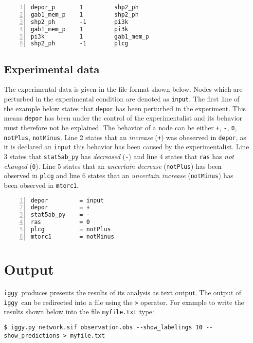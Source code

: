 \documentclass{article}
\newcommand\iggy{\texttt{iggy}}
\begin{document}
\begin{Verbatim}[frame=single,numbers=left]
depor_p       1         shp2_ph
gab1_mem_p    1         shp2_ph
shp2_ph       -1        pi3k
gab1_mem_p    1         pi3k
pi3k          1         gab1_mem_p
shp2_ph       -1        plcg
\end{Verbatim} 


\subsection{Experimental data}

The experimental data is given in the file format shown below.
Nodes which are perturbed in the experimental condition are denoted as \texttt{input}.
The first line of the example below states that \texttt{depor} has been perturbed in the experiment.
This means \texttt{depor} has been under the control of the experimentalist 
 and its behavior must therefore not be explained.
The behavior of a node can be either \texttt{+}, \texttt{-}, \texttt{0}, \texttt{notPlus}, \texttt{notMinus}.
Line 2 states that an \emph{increase} (\texttt{+}) was obeserved in \texttt{depor},
 as it is declared an \texttt{input} this behavior has been caused by the experimentalist.
Line 3 states that \texttt{stat5ab\_py} has \emph{decreased} (\texttt{-}) and
line 4 states that \texttt{ras} has \emph{not changed} (\texttt{0}).
Line 5 states that an \emph{uncertain decrease} (\texttt{notPlus}) has been observed in \texttt{plcg} and
line 6 states that an \emph{uncertain increase} (\texttt{notMinus}) has been observed in \texttt{mtorc1}.

\begin{Verbatim}[frame=single,numbers=left]
depor         = input 
depor         = +
stat5ab_py    = -
ras           = 0
plcg          = notPlus
mtorc1        = notMinus
\end{Verbatim}  


\section{Output}

\iggy\ produces presents the results of its analysis as text output. 
The output of \iggy\ can be redirected into a file using the \texttt{>} operator.
For example to write the results shown below into the file \texttt{myfile.txt} type:

\begin{Verbatim}[frame=single]
$ iggy.py network.sif observation.obs --show_labelings 10 --show_predictions > myfile.txt
\end{Verbatim}
\end{document}
